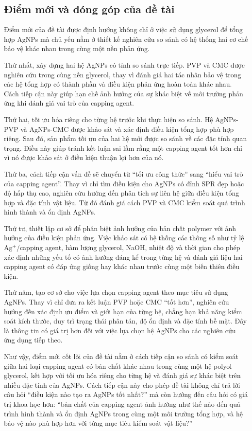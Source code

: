 \subsection{Điểm mới và đóng góp của đề tài}
Điểm mới của đề tài được định hướng không chỉ ở việc sử dụng glycerol để tổng hợp AgNPs mà chủ yếu nằm ở thiết kế nghiên cứu so sánh có hệ thống hai cơ chế bảo vệ khác nhau trong cùng một nền phản ứng.
\par
Thứ nhất, xây dựng hai hệ AgNPs có tính so sánh trực tiếp.
PVP và CMC được nghiên cứu trong cùng nền glycerol, thay vì đánh giá hai tác nhân bảo vệ trong các hệ tổng hợp có thành phần và điều kiện phản ứng hoàn toàn khác nhau.
Cách tiếp cận này giúp hạn chế ảnh hưởng của sự khác biệt về môi trường phản ứng khi đánh giá vai trò của capping agent.
\par
Thứ hai, tối ưu hóa riêng cho từng hệ trước khi thực hiện so sánh.
Hệ AgNPs-PVP và AgNPs-CMC được khảo sát và xác định điều kiện tổng hợp phù hợp riêng.
Sau đó, sản phẩm tối ưu của hai hệ mới được so sánh về các đặc tính quan trọng.
Điều này giúp tránh kết luận sai lầm rằng một capping agent tốt hơn chỉ vì nó được khảo sát ở điều kiện thuận lợi hơn của nó.
\par
Thứ ba, cách tiếp cận vấn đề sẽ chuyển từ ``tối ưu công thức'' sang ``hiểu vai trò của capping agent''.
Thay vì chỉ tìm điều kiện cho AgNPs có đỉnh SPR đẹp hoặc độ hấp thụ cao, nghiên cứu hướng đến phân tích sự liên hệ giữa điều kiện tổng hợp và đặc tính vật liệu.
Từ đó đánh giá cách PVP và CMC kiểm soát quá trình hình thành và ổn định AgNPs.
\par
Thứ tư, thiết lập cơ sở để phân biệt ảnh hưởng của bản chất polymer với ảnh hưởng của điều kiện phản ứng.
Việc khảo sát có hệ thống các thông số như tỷ lệ Ag$^+$/capping agent, hàm lượng glycerol, NaOH, nhiệt độ và thời gian cho phép xác định những yếu tố có ảnh hưởng đáng kể trong từng hệ và đánh giá liệu hai capping agent có đáp ứng giống hay khác nhau trước cùng một biến thiên điều kiện.
\par
Thứ năm, tạo cơ sở cho việc lựa chọn capping agent theo mục tiêu sử dụng AgNPs.
Thay vì chỉ đưa ra kết luận PVP hoặc CMC ``tốt hơn'', nghiên cứu hướng đến xác định ưu điểm và giới hạn của từng hệ, chẳng hạn khả năng kiểm soát kích thước, duy trì trạng thái phân tán, độ ổn định và đặc tính bề mặt.
Đây là thông tin có giá trị hơn đối với việc lựa chọn hệ AgNPs cho các nghiên cứu ứng dụng tiếp theo.
\par
Như vậy, điểm mới cốt lõi của đề tài nằm ở cách tiếp cận so sánh có kiểm soát giữa hai loại capping agent có bản chất khác nhau trong cùng một hệ polyol glycerol, kết hợp với tối ưu hóa riêng cho từng hệ và đánh giá sự khác biệt trên nhiều đặc tính của AgNPs.
Cách tiếp cận này cho phép đề tài không chỉ trả lời câu hỏi ``điều kiện nào tạo ra AgNPs tốt nhất?'' mà còn hướng đến câu hỏi có giá trị khoa học hơn: ``bản chất của capping agent ảnh hưởng như thế nào đến quá trình hình thành và ổn định AgNPs trong cùng một môi trường tổng hợp, và hệ bảo vệ nào phù hợp hơn với từng mục tiêu kiểm soát vật liệu?''
